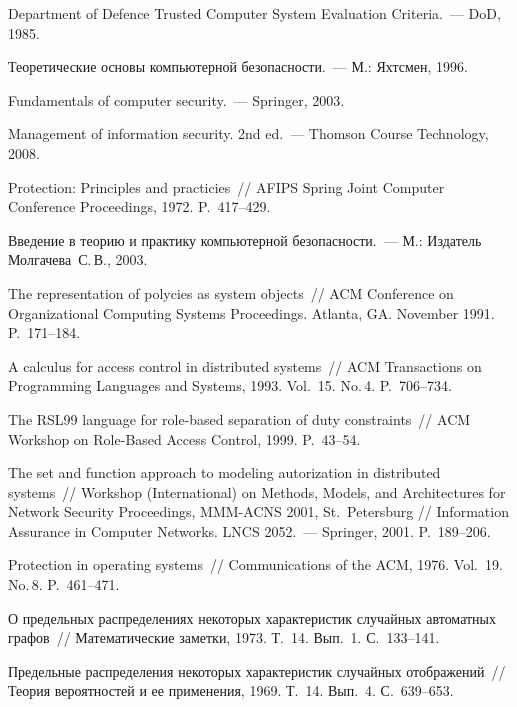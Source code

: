 \begin{multicols}{2}
{\small\frenchspacing
{%
\begin{thebibliography}{99}

Department of Defence Trusted Computer System Evaluation Criteria.~--- DoD, 1985.

Теоретические основы компьютерной безопасности.~--- М.: Яхтсмен, 1996.

Fundamentals of computer security.~--- Springer, 2003.

Management  of information security. 2nd ed.~--- Thomson Course Technology, 2008.

 Protection: Principles and practicies~//
AFIPS Spring Joint Computer Conference Proceedings, 1972. P.~417--429.

Введение в теорию и практику компьютерной безопасности.~--- М.: Издатель Молгачева~С.\,В., 2003.

The representation of polycies as system objects~// ACM Conference on
Organizational Computing Systems Proceedings. Atlanta, GA. November 1991. P.~171--184.

A calculus for
access control in distributed systems~// ACM Transactions on
Programming Languages and Systems, 1993. Vol.~15. No.\,4. P.~706--734.

The RSL99 language for role-based
separation of duty constraints~// ACM Workshop on Role-Based Access
Control, 1999. P.~43--54.

The set and function approach to modeling
autorization in distributed systems~//
Workshop (International) on Methods, Models, and Architectures for Network Security  Proceedings,
MMM-ACNS 2001, St.~Petersburg // Information Assurance in Computer
Networks. LNCS 2052.~--- Springer, 2001. P.~189--206.

Protection in operating
systems~// Communications of the ACM, 1976. Vol.~19. No.\,8. P.~461--471.

О предельных распределениях некоторых
характеристик случайных автоматных графов~// Математические заметки, 1973. 
Т.~14. Вып.~1. С.~133--141.

\label{end\stat}

Предельные распределения некоторых
характеристик случайных отображений~// Теория вероятностей и ее
применения, 1969. Т.~14. Вып.~4. С.~639--653.


 \end{thebibliography}
}
}


\end{multicols}